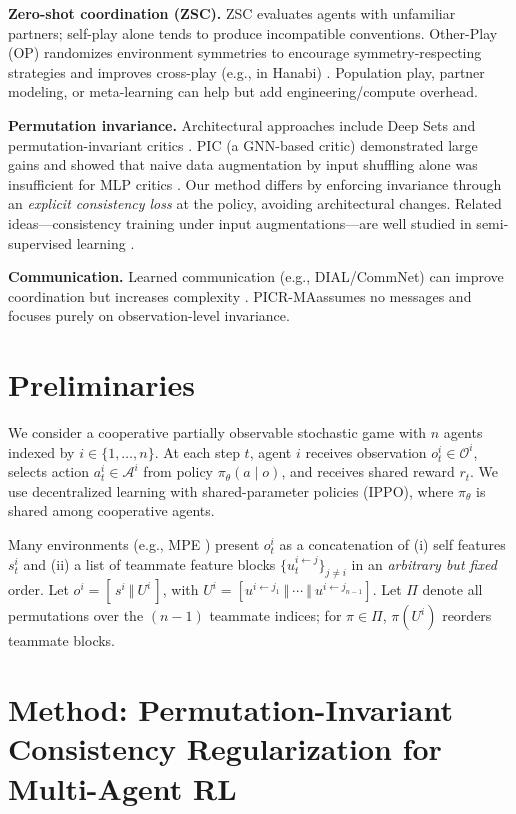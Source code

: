 \documentclass[nohyperref]{article}
\newcommand{\method}{PICR-MA} %
\newcommand{\longmethod}{Permutation-Invariant Consistency Regularization for Multi-Agent RL}
\begin{document}
\textbf{Zero-shot coordination (ZSC).} ZSC evaluates agents with unfamiliar partners; self-play alone tends to produce incompatible conventions. Other-Play (OP) randomizes environment symmetries to encourage symmetry-respecting strategies and improves cross-play (e.g., in Hanabi) \citep{hu2020otherplay}. Population play, partner modeling, or meta-learning can help but add engineering/compute overhead.

\textbf{Permutation invariance.} Architectural approaches include Deep Sets \citep{zaheer2017deepsets} and permutation-invariant critics \citep{liu2020pic}. PIC (a GNN-based critic) demonstrated large gains and showed that naive data augmentation by input shuffling alone was insufficient for MLP critics \citep{liu2020pic}. Our method differs by enforcing invariance through an \emph{explicit consistency loss} at the policy, avoiding architectural changes. Related ideas—consistency training under input augmentations—are well studied in semi-supervised learning \citep{tarvainen2017meanteacher, sohn2020fixmatch}.

\textbf{Communication.} Learned communication (e.g., DIAL/CommNet) can improve coordination but increases complexity \citep{foerster2016dqncomm, sukhbaatar2016commnet}. \method assumes no messages and focuses purely on observation-level invariance.

\section{Preliminaries}
We consider a cooperative partially observable stochastic game with $n$ agents indexed by $i\in\{1,\dots,n\}$. At each step $t$, agent $i$ receives observation $o^i_t\in\mathcal{O}^i$, selects action $a^i_t\in\mathcal{A}^i$ from policy $\pi_\theta(a\mid o)$, and receives shared reward $r_t$. We use decentralized learning with shared-parameter policies (IPPO), where $\pi_\theta$ is shared among cooperative agents.

Many environments (e.g., MPE \citep{terry2021pettingzoo}) present $o^i_t$ as a concatenation of (i) self features $s^i_t$ and (ii) a list of teammate feature blocks $\{u^{i\leftarrow j}_t\}_{j\neq i}$ in an \emph{arbitrary but fixed} order. Let $o^i = [\, s^i ~\Vert~ U^i \,]$, with $U^i = [u^{i\leftarrow j_1}~\Vert~\cdots~\Vert~u^{i\leftarrow j_{n-1}}]$. Let $\Pi$ denote all permutations over the $(n{-}1)$ teammate indices; for $\pi\in\Pi$, $\pi(U^i)$ reorders teammate blocks.

\section{Method: \longmethod}
\label{sec:method}
\end{document}
